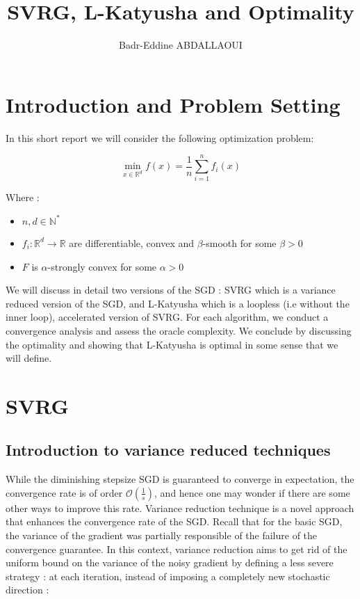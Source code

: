 \documentclass[12pt]{report}
\begin{document}
\title{SVRG, L-Katyusha and Optimality}

\author{Badr-Eddine ABDALLAOUI}

\maketitle


\newpage



\tableofcontents

\chapter{Introduction and Problem Setting}
In this short report we will consider the following optimization problem:


\begin{equation} \label{pb1}
\boxed{\min_{x\in \mathbb{R}^d} f(x)=\frac{1}{n}\sum_{i=1}^nf_i(x)}
\end{equation}

Where :
\begin{itemize}
    \item $n,d \in\mathbb{N}^*$
    \item $f_i :\mathbb{R}^d\longrightarrow\mathbb{R}$ are differentiable, convex and $\beta$-smooth for some $\beta>0$
    \item $F$ is $\alpha$-strongly convex for some $\alpha>0$
\end{itemize}



We will discuss in detail two versions of the SGD : SVRG which is a variance reduced version of the SGD, and L-Katyusha which is a loopless (i.e without the inner loop), accelerated version of SVRG. For each algorithm, we conduct a convergence analysis and assess the oracle complexity. We conclude by discussing the optimality and showing that L-Katyusha is optimal in some sense that we will define. 

\chapter{SVRG}
\section{Introduction to variance reduced techniques}
While the diminishing stepsize SGD is guaranteed to converge in expectation, the convergence rate is of order $\mathcal{O}(\frac{1}{s})$, and hence one may wonder if there are some other ways to improve this rate. 
Variance reduction technique is a novel approach that enhances the convergence rate of the SGD. Recall that for the basic SGD, the variance of the gradient was partially responsible of the failure of the convergence guarantee. In this context, variance reduction aims to get rid of the uniform bound on the variance of the noisy gradient by defining a less severe strategy : at each iteration, instead of imposing a completely new stochastic direction :
\end{document}
